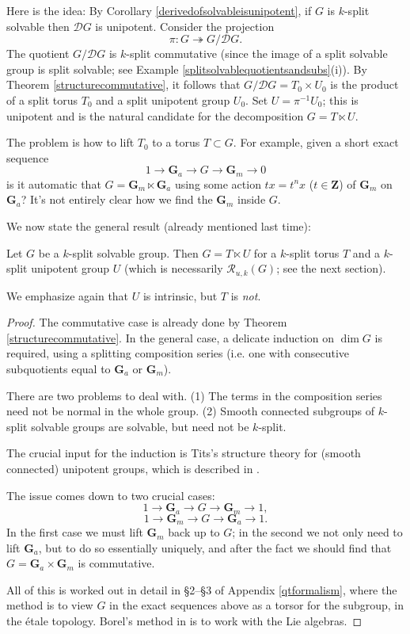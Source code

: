 \documentclass[10pt]{article}
\renewcommand{\(}{\left(}
\renewcommand{\)}{\right)}
\numberwithin{thm}{subsection}
\begin{document}
Here is the idea: By Corollary \ref{derivedofsolvableisunipotent},
if $G$ is $k$-split solvable then $\mathscr{D}G$ is unipotent. Consider the projection
\[\pi:G\twoheadrightarrow G/\mathscr{D}G.\]
The quotient $G/\mathscr{D}G$ is $k$-split commutative
(since the image of a split solvable group is split solvable; see
Example \ref{splitsolvablequotientsandsubs}(i)). 
By Theorem \ref{structurecommutative},
it follows that $G/\mathscr{D}G=T_0\times U_0$
is the product of a split torus $T_0$
and a split unipotent group $U_0$.
Set $U=\pi^{-1}U_0$;
this is unipotent and is the natural candidate for the decomposition
$G=T\ltimes U$.

The problem is how to lift $T_0$ to a torus $T\subset G$.
For example, given a short exact sequence
\[1\rightarrow \mathbf{G}_a\rightarrow G\rightarrow\mathbf{G}_m\rightarrow0\]
is it automatic
that $G=\mathbf{G}_m\ltimes \mathbf{G}_a$
using some action $tx=t^nx$ ($t\in\mathbf{Z}$) of $\mathbf{G}_m$ on $\mathbf{G}_a$?
It's not entirely clear
how we find the $\mathbf{G}_m$ inside $G$.

We now state the general result (already mentioned last time): 

\begin{prop}\label{structuresolvable}
Let $G$ be a $k$-split solvable group.
Then $G=T\ltimes U$
for a $k$-split torus $T$
and a $k$-split unipotent group $U$ 
(which is necessarily $\mathscr{R}_{u,k}(G)$;
see the next section).
\end{prop}
We emphasize again that $U$ is intrinsic, but $T$ is \textit{not}.
\begin{proof}
 The commutative case is already done by Theorem \ref{structurecommutative}.
In the general case, a delicate induction on $\dim G$ is required,
using a splitting composition series (i.e. one with consecutive subquotients
equal to $\mathbf{G}_a$ or $\mathbf{G}_m$).

There are two problems to deal with. (1) The terms in the composition series
need not be normal in the whole group. (2) Smooth connected subgroups of $k$-split solvable groups are solvable, but need not be $k$-split.

The crucial input for the induction is Tits's structure theory for (smooth connected) unipotent groups, 
which is described in \cite[App.\,B]{pred}. 


The issue comes down to two crucial cases:
\[1\rightarrow\mathbf{G}_a\rightarrow G\rightarrow\mathbf{G}_m\rightarrow 1,\]
\[1\rightarrow\mathbf{G}_m\rightarrow G\rightarrow\mathbf{G}_a\rightarrow 1.\]
In the first case we must lift $\mathbf{G}_m$ back up to $G$;
in the second we not only need to lift $\mathbf{G}_a$, but to do so essentially uniquely, and after the fact we should find that $G=\mathbf{G}_a\times \mathbf{G}_m$ is commutative.

All of this is worked out in detail in \S2--\S3 of Appendix \ref{qtformalism}, 
where the method is to view $G$ in the exact sequences above
as a torsor for the subgroup, in the \'etale topology.
Borel's method in \cite{borel} is to work with the Lie algebras.
\end{proof}
\end{document}
